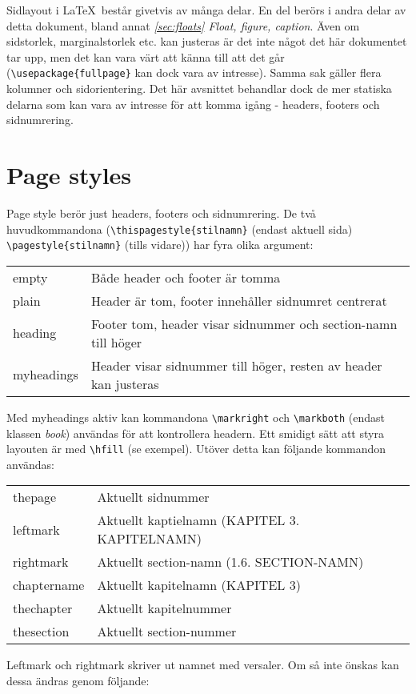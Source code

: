 Sidlayout i \LaTeX\ består givetvis av många delar. En del berörs i andra delar av detta dokument, bland annat \emph{\ref{sec:floats} Float, figure, caption}. Även om sidstorlek, marginalstorlek etc. kan justeras är det inte något det här dokumentet tar upp, men det kan vara värt att känna till att det går (\verb+\usepackage{fullpage}+ kan dock vara av intresse). Samma sak gäller flera kolumner och sidorientering. Det här avsnittet behandlar dock de mer statiska delarna som kan vara av intresse för att komma igång - headers, footers och sidnumrering.
\section{Page styles}
Page style berör just headers, footers och sidnumrering. De två huvudkommandona (\verb+\thispagestyle{stilnamn}+ (endast aktuell sida) \verb+\pagestyle{stilnamn}+ (tills vidare)) har fyra olika argument:

\begin{tabular}{ll}
  empty & Både header och footer är tomma \\
  plain & Header är tom, footer innehåller sidnumret centrerat\\
  heading & Footer tom, header visar sidnummer och section-namn till höger\\
  myheadings & Header visar sidnummer till höger, resten av header kan justeras
\end{tabular}

Med myheadings aktiv kan kommandona \verb+\markright+ och \verb+\markboth+ (endast klassen \emph{book}) användas för att kontrollera headern. Ett smidigt sätt att styra layouten är med \verb+\hfill+ (se exempel). Utöver detta kan följande kommandon användas:

\begin{tabular}{ll}
  \tb{}thepage     & Aktuellt sidnummer\\
  \tb{}leftmark    & Aktuellt kaptielnamn (KAPITEL 3. KAPITELNAMN)\\
  \tb{}rightmark   & Aktuellt section-namn (1.6. SECTION-NAMN)\\
  \tb{}chaptername & Aktuellt kapitelnamn (KAPITEL 3)\\
  \tb{}thechapter  & Aktuellt kapitelnummer\\
  \tb{}thesection  & Aktuellt section-nummer
\end{tabular}

Leftmark och rightmark skriver ut namnet med versaler. Om så inte önskas kan dessa ändras genom följande:

